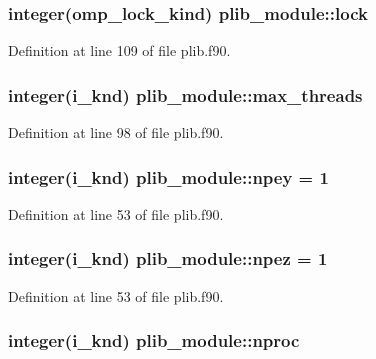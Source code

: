 \hypertarget{classplib__module_a3f4964cd381feb76e21407e3b96915c9}{
\subsubsection[{lock}]{\setlength{\rightskip}{0pt plus 5cm}integer(omp\-\_\-lock\-\_\-kind) plib\-\_\-module\-::lock}}\label{classplib__module_a3f4964cd381feb76e21407e3b96915c9}


Definition at line 109 of file plib.\-f90.

\hypertarget{classplib__module_aac421ecf4251867c4bff7045095d596c}{
\subsubsection[{max\-\_\-threads}]{\setlength{\rightskip}{0pt plus 5cm}integer(i\-\_\-knd) plib\-\_\-module\-::max\-\_\-threads}}\label{classplib__module_aac421ecf4251867c4bff7045095d596c}


Definition at line 98 of file plib.\-f90.

\hypertarget{classplib__module_a90134f6aac88ad1d7341e79cbf8426f1}{
\subsubsection[{npey}]{\setlength{\rightskip}{0pt plus 5cm}integer(i\-\_\-knd) plib\-\_\-module\-::npey = 1}}\label{classplib__module_a90134f6aac88ad1d7341e79cbf8426f1}


Definition at line 53 of file plib.\-f90.

\hypertarget{classplib__module_ab827d3c46ffc494381bb0962d304561a}{
\subsubsection[{npez}]{\setlength{\rightskip}{0pt plus 5cm}integer(i\-\_\-knd) plib\-\_\-module\-::npez = 1}}\label{classplib__module_ab827d3c46ffc494381bb0962d304561a}


Definition at line 53 of file plib.\-f90.

\hypertarget{classplib__module_ae01601bf17ba60fbd8ec154182186409}{
\subsubsection[{nproc}]{\setlength{\rightskip}{0pt plus 5cm}integer(i\-\_\-knd) plib\-\_\-module\-::nproc}}\label{classplib__module_ae01601bf17ba60fbd8ec154182186409}


